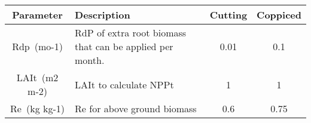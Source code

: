 \begin{tabularx}{\linewidth}{|c|X|c|c|}
  \hline
  Parameter & Description & Cutting & Coppiced\\
\hline
\acs{Rdp}~(mo-1) & \acf{RdP} of extra root biomass that can be applied per month. & 0.01 & 0.1\\
\ac{LAIt}~(m2 m-2) & \acf{LAIt} to calculate \acs{NPPt} & 1 & 1\\
\acs{Re}~(kg kg-1) & \acf{Re} for above ground biomass & 0.6 & 0.75\\
\hline
\end{tabularx}


